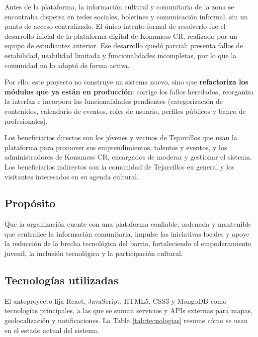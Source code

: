 Antes de la plataforma, la información cultural y comunitaria de la zona se encontraba dispersa en redes sociales, boletines y comunicación informal, sin un punto de acceso centralizado. El único intento formal de resolverlo fue el desarrollo inicial de la plataforma digital de Komuness CR, realizado por un equipo de estudiantes anterior. Ese desarrollo quedó parcial: presenta fallos de estabilidad, usabilidad limitada y funcionalidades incompletas, por lo que la comunidad no lo adoptó de forma activa.

Por ello, este proyecto no construye un sistema nuevo, sino que \textbf{refactoriza los módulos que ya están en producción}: corrige los fallos heredados, reorganiza la interfaz e incorpora las funcionalidades pendientes (categorización de contenidos, calendario de eventos, roles de usuario, perfiles públicos y banco de profesionales).

Los beneficiarios directos son los jóvenes y vecinos de Tejarcillos que usan la plataforma para promover sus emprendimientos, talentos y eventos, y los administradores de Komuness CR, encargados de moderar y gestionar el sistema. Los beneficiarios indirectos son la comunidad de Tejarcillos en general y los visitantes interesados en su agenda cultural.

\subsection{Propósito}
Que la organización cuente con una plataforma confiable, ordenada y mantenible que centralice la información comunitaria, impulse las iniciativas locales y apoye la reducción de la brecha tecnológica del barrio, fortaleciendo el empoderamiento juvenil, la inclusión tecnológica y la participación cultural.

\subsection{Tecnologías utilizadas}
El anteproyecto fija React, JavaScript, HTML5, CSS3 y MongoDB como tecnologías principales, a las que se suman servicios y APIs externas para mapas, geolocalización y notificaciones. La Tabla \ref{tab:tecnologias} resume cómo se usan en el estado actual del sistema.

